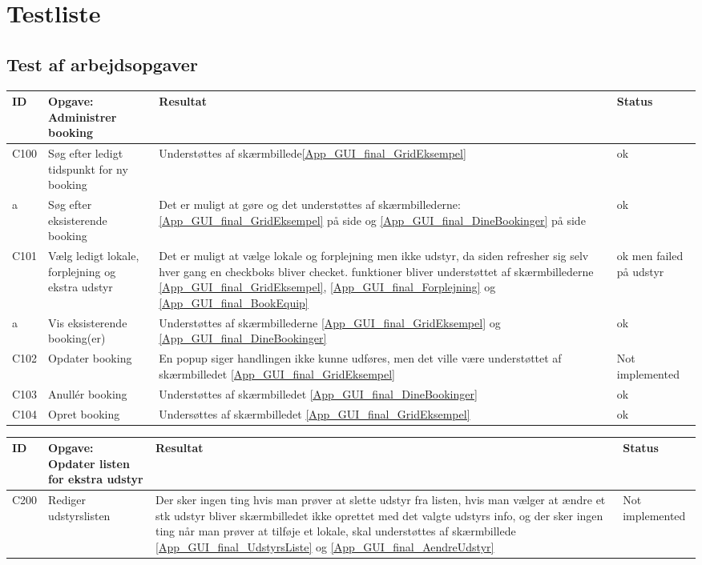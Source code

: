 \section{Testliste}
\label{App_Test_ListOfTest}

\subsection{Test af arbejdsopgaver}
\label{App_Test_ListOfTest_Work}

\begin{tabularx}{\textwidth}{ |X|X|X|X| }
\hline
	ID & Opgave: Administrer booking & Resultat & Status\\ 
\hline
	C100 & Søg efter ledigt tidspunkt for ny booking & Understøttes af skærmbillede\ref{App_GUI_final_GridEksempel} & ok \\
\hline
	a & Søg efter eksisterende booking & Det er muligt at gøre og det understøttes af skærmbillederne: \ref{App_GUI_final_GridEksempel} på side \pageref{App_GUI_final_GridEksempel} og \ref{App_GUI_final_DineBookinger} på side \pageref{App_GUI_final_DineBookinger} & ok \\
\hline
	C101 & Vælg ledigt lokale, forplejning og ekstra udstyr & Det er muligt at vælge lokale og forplejning men ikke udstyr, da siden refresher sig selv hver gang en checkboks bliver checket. funktioner bliver understøttet af skærmbillederne \ref{App_GUI_final_GridEksempel}, \ref{App_GUI_final_Forplejning} og \ref{App_GUI_final_BookEquip}  & ok men failed på udstyr \\
\hline
	a & Vis eksisterende booking(er) & Understøttes af skærmbillederne \ref{App_GUI_final_GridEksempel} og \ref{App_GUI_final_DineBookinger} & ok \\
\hline
	C102 & Opdater booking & En popup siger handlingen ikke kunne udføres, men det ville være understøttet af skærmbilledet \ref{App_GUI_final_GridEksempel} & Not implemented \\
\hline
	C103 & Anullér booking & Understøttes af skærmbilledet \ref{App_GUI_final_DineBookinger} & ok \\
\hline
	C104 & Opret booking & Undersøttes af skærmbilledet \ref{App_GUI_final_GridEksempel} & ok \\
\hline
\end{tabularx}

\begin{tabularx}{\textwidth}{ |X|X|X|X| }
\hline
	ID & Opgave: Opdater listen for ekstra udstyr & Resultat & Status\\ 
\hline
	C200 & Rediger udstyrslisten & Der sker ingen ting hvis man prøver at slette udstyr fra listen, hvis man vælger at ændre et stk udstyr bliver skærmbilledet ikke oprettet med det valgte udstyrs info, og der sker ingen ting når man prøver at tilføje et lokale, skal understøttes af skærmbillede \ref{App_GUI_final_UdstyrsListe} og \ref{App_GUI_final_AendreUdstyr} & Not implemented \\
\hline
\end{tabularx}

